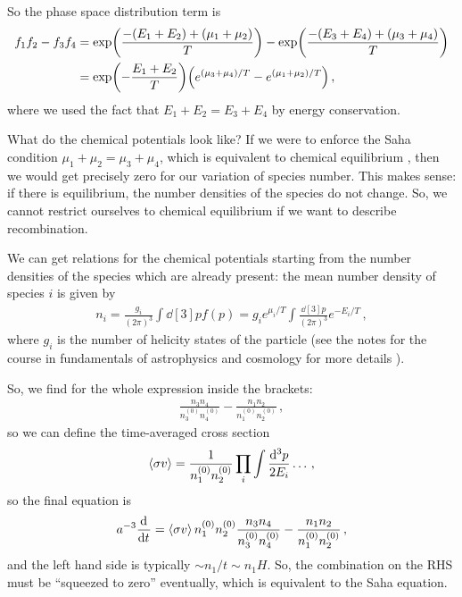 \documentclass[main.tex]{subfiles}
\begin{document}
So the phase space distribution term is 
%
\begin{align}
f_1 f_2 - f_3 f_4 &= \exp(\frac{-(E_1 + E_2 ) + (\mu_1 +\mu_2 )}{T})
- \exp(\frac{-(E_3 + E_4) + (\mu_3 +\mu_4 )}{T})\\
&=\exp(- \frac{E_1 + E_2 }{T} ) \qty(e^{(\mu_3 + \mu_4 ) / T} - e^{(\mu_1 + \mu_2 ) / T})
\,,
\end{align}
%
where we used the fact that \(E_1 + E_2 = E_3 + E_4 \) by energy conservation. 

What do the chemical potentials look like?
If we were to enforce the Saha condition \(\mu_1 + \mu_2 = \mu_3 + \mu_4 \), which is equivalent to chemical equilibrium , then we would get precisely zero for our variation of species number.
This makes sense: if there is equilibrium, the number densities of the species do not change.
So, we cannot restrict ourselves to chemical equilibrium if we want to describe recombination. 

We can get relations for the chemical potentials starting from the number densities of the species which are already present:
the mean number density of species \(i\) is given by 
%
\begin{align}
n_i = \frac{g_i}{(2\pi)^3} \int \dd[3]{p} f(p)
= g_i e^{\mu_{i} / T} \int \frac{ \dd[3]{p} }{(2 \pi )^3} e^{-E_i / T}
\,,
\end{align}
%
where \(g_i\) is the number of helicity states of the particle (see the notes for the course in fundamentals of astrophysics and cosmology for more details \cite[]{tissinoFundamentalsAstrophysicsCosmology2020}). 

So, we find for the whole expression inside the brackets:
%
\begin{align}
\frac{n_3 n_4 }{n_3^{(0)} n_4^{(0)}}
- 
\frac{n_1 n_2 }{n_1^{(0)} n_2^{(0)}}
\,,
\end{align}
%
so we can define the time-averaged cross section 
%
\begin{align}
\expval{\sigma v} = \frac{1}{n_1^{(0)} n_2^{(0)}}
\prod_{i} \int \frac{ \dd[3]{p}}{2 E_i} \dots
\,,
\end{align}
%
so the final equation is 
%
\begin{align}
a^{-3} \dv[]{}{t} (n_1 a^3)
= \expval{\sigma v} n_1^{(0)} n_2^{(0)} 
\frac{n_3 n_4 }{n_3^{(0)} n_4^{(0)}}
- 
\frac{n_1 n_2 }{n_1^{(0)} n_2^{(0)}}
\,,
\end{align}
%
and the left hand side is typically \(\sim n_1 / t \sim n_1 H\). So, the combination on the RHS must be ``squeezed to zero'' eventually, which is equivalent to the Saha equation. 
\end{document}
